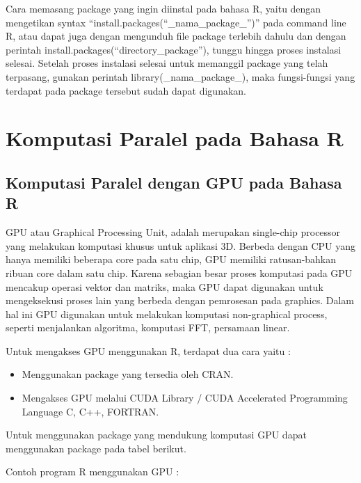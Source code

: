Cara memasang package yang ingin diinstal pada bahasa R, yaitu dengan mengetikan syntax “install.packages(“\_nama\_package\_”)” pada command line R, atau dapat juga dengan mengunduh file package terlebih dahulu dan dengan perintah install.packages(“directory\_package”), tunggu hingga proses instalasi selesai. Setelah proses instalasi selesai untuk memanggil package yang telah terpasang, gunakan perintah library(\_nama\_package\_), maka fungsi-fungsi yang terdapat pada package tersebut sudah dapat digunakan. 
\section{Komputasi Paralel pada Bahasa R}

\subsection{Komputasi Paralel dengan GPU pada Bahasa R}

GPU atau Graphical Processing Unit, adalah merupakan single-chip processor yang melakukan komputasi khusus untuk aplikasi 3D.  Berbeda dengan CPU yang hanya memiliki beberapa core pada satu chip, GPU memiliki ratusan-bahkan ribuan core dalam satu chip. Karena sebagian besar proses komputasi pada GPU mencakup operasi vektor dan matriks, maka GPU dapat digunakan untuk mengeksekusi proses lain yang berbeda dengan pemrosesan pada graphics. Dalam hal ini GPU digunakan untuk melakukan komputasi non-graphical process, seperti menjalankan algoritma, komputasi FFT, persamaan linear.

Untuk mengakses GPU menggunakan R, terdapat dua cara yaitu :

\begin{itemize}
\item Menggunakan package yang tersedia oleh CRAN.
\item Mengakses GPU melalui CUDA Library / CUDA Accelerated Programming Language C, C++, FORTRAN.
\end{itemize}

Untuk menggunakan package yang mendukung komputasi GPU dapat menggunakan package pada tabel berikut.

Contoh program R menggunakan GPU :

